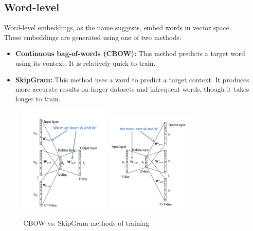 \subsection{Word-level}
Word-level embeddings, as the name suggests, embed words in vector space. These embeddings are generated using one of two methods:
\begin{itemize}
\item \textbf{Continuous bag-of-words (CBOW):} This method predicts a target word using its context. It is relatively quick to train.
\item \textbf{SkipGram:} This method uses a word to predict a target context. It produces more accurate results on larger datasets and infrequent words, though it takes longer to train.
\end{itemize}
\begin{figure}[h!]
\begin{center}
\includegraphics[width=0.4\textwidth]{Figures/CBOW.PNG}
\includegraphics[width=0.4\textwidth]{Figures/SkipGram.PNG}
\caption{CBOW vs. SkipGram methods of training \footnotemark}
\end{center}
\end{figure}

